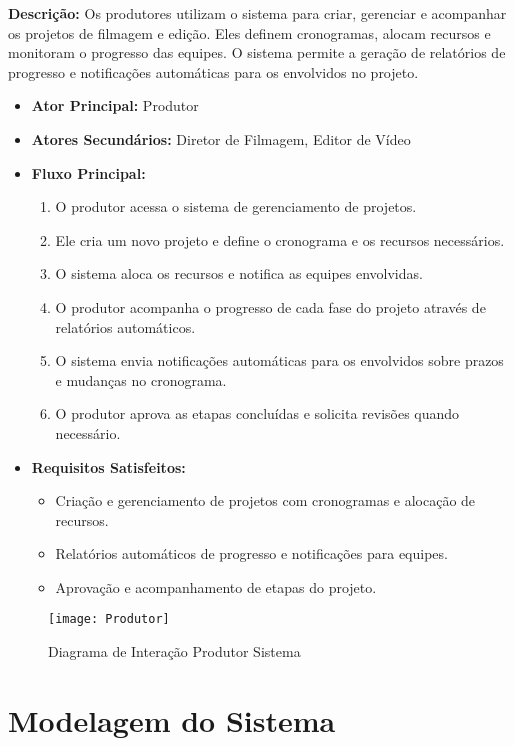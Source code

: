 \textbf{Descrição:} Os produtores utilizam o sistema para criar, gerenciar e acompanhar os projetos de filmagem e edição. Eles definem cronogramas, alocam recursos e monitoram o progresso das equipes. O sistema permite a geração de relatórios de progresso e notificações automáticas para os envolvidos no projeto.

\begin{itemize}
  \item \textbf{Ator Principal:} Produtor
  \item \textbf{Atores Secundários:} Diretor de Filmagem, Editor de Vídeo
  \item \textbf{Fluxo Principal:}
    \begin{enumerate}
      \item O produtor acessa o sistema de gerenciamento de projetos.
      \item Ele cria um novo projeto e define o cronograma e os recursos necessários.
      \item O sistema aloca os recursos e notifica as equipes envolvidas.
      \item O produtor acompanha o progresso de cada fase do projeto através de relatórios automáticos.
      \item O sistema envia notificações automáticas para os envolvidos sobre prazos e mudanças no cronograma.
      \item O produtor aprova as etapas concluídas e solicita revisões quando necessário.
    \end{enumerate}
  \item \textbf{Requisitos Satisfeitos:}
    \begin{itemize}
      \item Criação e gerenciamento de projetos com cronogramas e alocação de recursos.
      \item Relatórios automáticos de progresso e notificações para equipes.
      \item Aprovação e acompanhamento de etapas do projeto.
    \end{itemize}
\end{itemize}


\begin{figure}[ht]
    \centering
    \texttt{[image: Produtor]}
    \caption{Diagrama de Interação Produtor Sistema}
    \label{fig:diagram1}
\end{figure}

\section{Modelagem do Sistema}


